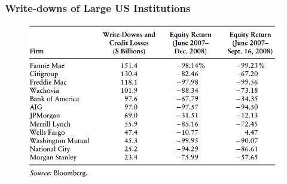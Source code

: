 \documentclass[11pt]{beamer}
\begin{document}
\begin{frame}
  \frametitle{Write-downs of Large US Institutions}
\begin{figure}
\includegraphics[width=\textwidth]{Figures/table6_1.png}
\end{figure}
\end{frame}

\begin{frame}
\end{frame}

\end{document}
